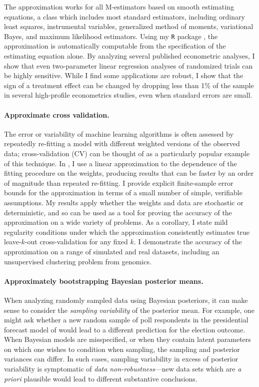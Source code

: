 The approximation works for all M-estimators based on smooth estimating
equations, a class which includes most standard estimators, including ordinary
least squares, instrumental variables, generalized method of moments,
variational Bayes, and maximum likelihood estimators. Using my \texttt{R}
package \citep{zaminfluence}, the approximation is automatically computable from
the specification of the estimating equation alone.  By analyzing several
published econometric analyses,
I show that even two-parameter linear regression analyses of randomized trials
can be highly sensitive.  While I find some applications are robust, I show that
the sign of a treatment effect can be changed by dropping less than 1\% of the
sample in  several high-profile econometrics studies, even when standard errors
are small.


\paragraph{Approximate cross validation.}
%
The error or variability of machine learning algorithms is often assessed by
repeatedly re-fitting a model with different weighted versions of the observed
data; cross-validation (CV) can be thought of as a particularly popular example
of this technique.
%
In \citet{giordano:2019:ij}, I use a linear approximation to the dependence of
the fitting procedure on the weights, producing results that can be faster by an
order of magnitude than repeated re-fitting. I provide explicit finite-sample
error bounds for the approximation in terms of a small number of simple,
verifiable assumptions.  My results apply whether the weights and data are
stochastic or deterministic, and so can be used as a tool for proving the
accuracy of the approximation on a wide variety of problems. As a
corollary, I state mild regularity conditions under which the approximation
consistently estimates true leave-$k$-out cross-validation for any fixed $k$. I
demonstrate the accuracy of the approximation on a range of simulated and real
datasets, including an unsupervised clustering problem from genomics.


\paragraph{Approximately bootstrapping Bayesian posterior means.}
%
When analyzing randomly sampled data using Bayesian posteriors, it can make
sense to consider the \emph{sampling variability} of the posterior mean.  For
example, one might ask whether a new random sample of poll respondents in the
presidential forecast model of \citet{economist:2020:election} would lead to a
different prediction for the election outcome.  When Bayesian models are
misspecified, or when they contain latent parameters on which one wishes to
condition when sampling, the sampling and posterior variances can differ.  In
such cases, sampling variability in excess of posterior variability is
symptomatic of \emph{data non-robustness}---new data sets which are \textit{a
priori} plausible would lead to different substantive conclusions.

